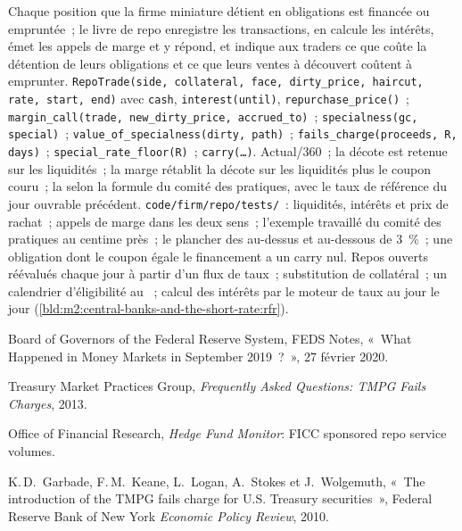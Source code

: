 \begin{build}
 Chaque position que la firme miniature détient en obligations est
financée ou empruntée~; le livre de repo enregistre les transactions, en calcule les intérêts, émet les appels de marge
et y répond, et indique aux traders ce que coûte la détention de leurs obligations et ce que
leurs ventes à découvert coûtent à emprunter.  \texttt{RepoTrade(side, collateral, face, dirty\_price,
haircut, rate, start, end)} avec \texttt{cash}, \texttt{interest(until)},
\texttt{repurchase\_price()}~; \texttt{margin\_call(trade, new\_dirty\_price,
accrued\_to)}~; \texttt{specialness(gc, special)}~;
\texttt{value\_of\_specialness(dirty, path)}~; \texttt{fails\_charge(proceeds,
R, days)}~; \texttt{special\_rate\_floor(R)}~; \texttt{carry(\ldots)}.
 Actual/360~; la décote est retenue sur les liquidités~; la marge rétablit
la décote sur les liquidités plus le coupon couru~; la  selon la formule du comité des
pratiques, avec le taux de référence du jour ouvrable précédent.
 \texttt{code/firm/repo/tests/}~: liquidités, intérêts et
prix de rachat~; appels de marge dans les deux sens~; l'exemple travaillé du comité des
pratiques au centime près~; le plancher des  au-dessus et au-dessous de 3~\%~; une obligation
dont le coupon égale le financement a un carry nul.
 Repos ouverts réévalués chaque jour à partir d'un flux de taux~; substitution de
collatéral~; un calendrier d'éligibilité au ~; calcul des intérêts par le
moteur de taux au jour le jour (\cref{bld:m2:central-banks-and-the-short-rate:rfr}).
\end{build}

\begin{omsources}
\item Board of Governors of the Federal Reserve System, FEDS Notes, «~What
Happened in Money Markets in September 2019~?~», 27 février 2020.
\item Treasury Market Practices Group, \emph{Frequently Asked Questions: TMPG
Fails Charges}, 2013.
\item Office of Financial Research, \emph{Hedge Fund Monitor}: FICC sponsored
repo service volumes.
\item K.\,D.\ Garbade, F.\,M.\ Keane, L.\ Logan, A.\ Stokes et J.\ Wolgemuth,
«~The introduction of the TMPG fails charge for U.S. Treasury securities~»,
Federal Reserve Bank of New York \emph{Economic Policy Review}, 2010.
\end{omsources}


